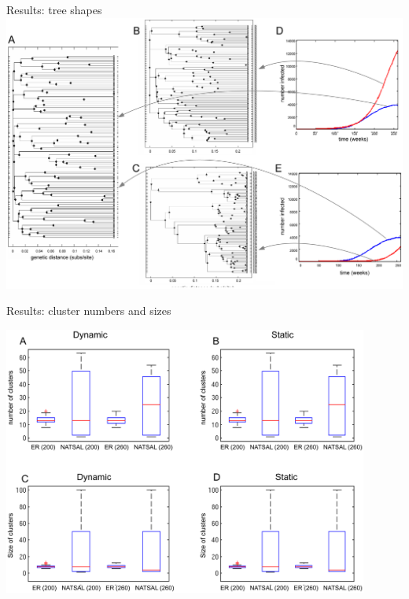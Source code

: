 \documentclass{beamer}
\begin{document}
\begin{frame}{Results: tree shapes}
    \includegraphics[width=\textwidth]{f2}
\end{frame}

\begin{frame}{Results: cluster numbers and sizes}
    \begin{center}
        \vspace{-0.5cm}
        \includegraphics[width=0.9\textwidth]{f3}
    \end{center}
\end{frame}
\end{document}
